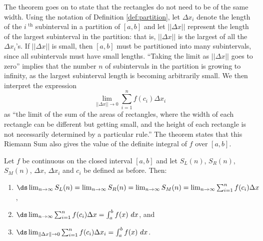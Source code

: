 The theorem goes on to state that the rectangles do not need to be of the same width. Using the notation of Definition \ref{def:partition}, let $\Delta x_i$ denote the length of the $i^\text{ th}$ subinterval in a partition of $[a,b]$ and let $||\Delta x||$ represent the length of the largest subinterval in the partition: that is, $||\Delta x||$ is the largest of all the $\Delta x_i$'s. If $||\Delta x||$ is small, then $[a,b]$ must be partitioned into many subintervals, since all subintervals must have small lengths. ``Taking the limit as $||\Delta x||$ goes to zero'' implies that the number $n$ of subintervals in the partition is growing to infinity, as the largest subinterval length is becoming arbitrarily small. We then interpret the expression 
$$\lim_{||\Delta x||\to 0}\sum_{i=1}^nf(c_i)\Delta x_i$$
as ``the limit of the sum of the areas of rectangles, where the width of each rectangle can be different but getting small, and the height of each rectangle is not necessarily determined by a particular rule.'' The theorem states that this Riemann Sum also gives the value of the definite integral of $f$ over $[a,b]$.


{Let $f$ be continuous on the closed interval $[a,b]$  and let $S_L(n)$, $S_R(n)$, $S_M(n)$, $\Delta x$, $\Delta x_i$ and $c_i$ be defined as before. Then:
\begin{enumerate}
	\item		$\ds \lim_{n\to\infty} S_L(n) = \lim_{n\to\infty} S_R(n) = \lim_{n\to\infty} S_M(n) = \lim_{n\to\infty}\sum_{i=1}^n f(c_i)\Delta x$, 
	
	\item		$\ds \lim_{n\to\infty}\sum_{i=1}^n f(c_i)\Delta x = \int_a^b f(x)\ dx$, and %
	\item		$\ds \lim_{\|\Delta x\|\to 0} \sum_{i=1}^n f(c_i)\Delta x_i = \int_a^b f(x)\ dx$.%
\end{enumerate}
}

